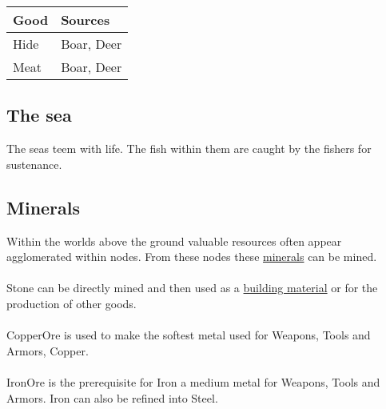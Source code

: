 \begin{longtable}{ll}
	\toprule
	Good       & Sources                \\
	\midrule
	\Gls{Hide} & \Gls{Boar}, \gls{Deer} \\
	\Gls{Meat} & \Gls{Boar}, \gls{Deer} \\
	\bottomrule
\end{longtable}

\subsection{The sea}\label{ch:Goods:Nature:Sea}

The seas teem with life. The fish within them are caught by the fishers for
sustenance.

\subsection{Minerals}\label{ch:Goods:Nature:Minerals}

Within the worlds above the ground valuable resources often appear agglomerated
within nodes. From these nodes these \hyperref[ch:World:Minerals]{minerals} can
be mined.

\paragraph{}

\Gls*{Stone} can be directly mined and then used as a
\hyperref[ch:Goods:Materials]{building material}
or for the production of other goods.

\paragraph{}

\Gls*{CopperOre} is used to make the softest metal used for \glspl{Weapon}, \glspl{Tool} and \glspl{Armor}, \gls{Copper}.

\paragraph{}

\Gls*{IronOre} is the prerequisite for \gls{Iron} a medium metal for \glspl{Weapon}, \glspl{Tool} and \glspl{Armor}.
\Gls{Iron} can also be refined into \Gls{Steel}.

\paragraph{}

